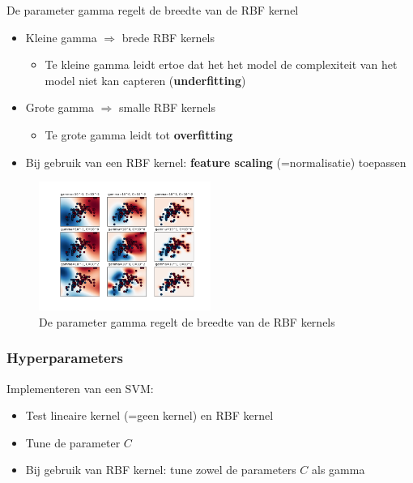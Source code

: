 \documentclass{article}
\begin{document}
De parameter gamma regelt de breedte van de RBF kernel

\begin{itemize}
    \item Kleine gamma $\Rightarrow$ brede RBF kernels
    \begin{itemize}
        \item Te kleine gamma leidt ertoe dat het het model de complexiteit van het model niet kan capteren (\textbf{underfitting})
    \end{itemize}
    \item Grote gamma $\Rightarrow$ smalle RBF kernels
    \begin{itemize}
        \item Te grote gamma leidt tot \textbf{overfitting}
    \end{itemize}
    \item Bij gebruik van een RBF kernel: \textbf{feature scaling} (=normalisatie) toepassen
\end{itemize}

\begin{figure}[H]
    \centering
    \includegraphics[width=0.5\textwidth]{svm-kernel-gamma.png}
    \caption{De parameter gamma regelt de breedte van de RBF kernels}
\end{figure}

\subsubsection{Hyperparameters}

Implementeren van een SVM:

\begin{itemize}
    \item Test lineaire kernel (=geen kernel) en RBF kernel
    \item Tune de parameter $C$
    \item Bij gebruik van RBF kernel: tune zowel de parameters $C$ als gamma
\end{itemize}
\end{document}
